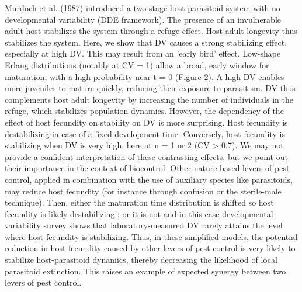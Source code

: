 \documentclass[12pt,a4paper,onecolumn]{article}
\begin{document}
\tabto{1.5 cm} Murdoch et al. (1987) introduced a two-stage host-parasitoid system with no developmental variability (DDE framework). The presence of an invulnerable adult host stabilizes the system through a refuge effect. Host adult longevity thus stabilizes the system. Here, we show that DV causes a strong stabilizing effect, especially at high DV. This may result from an 'early bird' effect. Low-shape Erlang distributions (notably at CV = 1) allow a broad, early window for maturation, with a high probability near t = 0 (Figure 2). A high DV enables more juveniles to mature quickly, reducing their exposure to parasitism. DV thus complements host adult longevity by increasing the number of individuals in the refuge, which stabilizes population dynamics. However, the dependency of the effect of host fecundity on stability on DV is more surprising. Host fecundity is destabilizing in case of a fixed development time. Conversely, host fecundity is stabilizing when DV is very high, here at n = 1 or 2 (CV > 0.7). We may not provide a confident interpretation of these contrasting effects, but we point out their importance in the context of biocontrol. Other nature-based levers of pest control, applied in combination with the use of auxiliary species like parasitoids, may reduce host fecundity (for instance through confusion or the sterile-male technique). Then, either the maturation time distribution is shifted so host fecundity is likely destabilizing ; or it is not and in this case developmental variability survey shows that laboratory-measured DV rarely attains the level where host fecundity is stabilizing. Thus, in these simplified models, the potential reduction in host fecundity caused by other levers of pest control is very likely to stabilize host-parasitoid dynamics, thereby decreasing the likelihood of local parasitoid extinction. This raises an example of expected synergy between two levers of pest control. 
\end{document}
